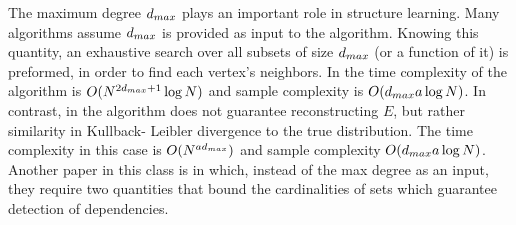 The maximum degree $d_{max}$ plays an important role in structure learning.
Many algorithms \cite{bresler2008reconstruction, abbeel2006learning} assume $d_{max}$ is provided as input to the algorithm.
Knowing this quantity, an exhaustive search over all subsets of size $d_{max}$ (or a function of it) is preformed, in order to find each vertex's neighbors.
In\cite{bresler2008reconstruction} the time complexity of the algorithm is $O({N}^{2d_{max}+1}\log N)$ and sample complexity is $O(d_{max} a \log N)$.
In contrast, in \cite{abbeel2006learning} the algorithm does not guarantee reconstructing $E$, but rather similarity in Kullback- Leibler divergence to the true distribution.
The time complexity in this case is $O({N}^{a d_{max}})$ and sample complexity $O(d_{max} a \log {N})$. Another paper in this class is \cite{wu2013learning} in which, instead of the max degree as an input, they require two quantities that bound the cardinalities of sets which guarantee detection of dependencies. 

